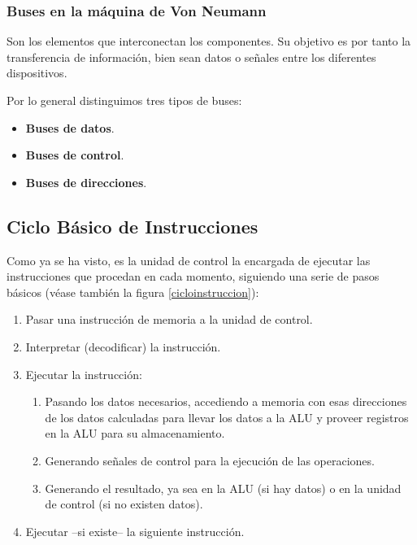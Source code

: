 \documentclass[a4paper, 11pt, titlepage]{article}
\begin{document}
        \subsubsection{Buses en la máquina de Von Neumann}

            Son los elementos que interconectan los componentes. Su objetivo es por tanto la transferencia 
            de información, bien sean datos o señales entre los diferentes dispositivos.

            Por lo general distinguimos tres tipos de buses:

            \begin{itemize}
                \item \textbf{Buses de datos}.
                \item \textbf{Buses de control}.
                \item \textbf{Buses de direcciones}.
            \end{itemize}

    \subsection{Ciclo Básico de Instrucciones}

        Como ya se ha visto, es la unidad de control la encargada de ejecutar las instrucciones que procedan 
        en cada momento, siguiendo una serie de pasos básicos (véase también la figura \ref{cicloinstruccion}):

        \begin{enumerate}
            \item Pasar una instrucción de memoria a la unidad de control.
            \item Interpretar (decodificar) la instrucción.
            \item Ejecutar la instrucción:
            \begin{enumerate}
                \item Pasando los datos necesarios, accediendo a memoria con esas direcciones de los datos 
                calculadas para llevar los datos a la ALU y proveer registros en la ALU para su almacenamiento.
                \item Generando señales de control para la ejecución de las operaciones.
                \item Generando el resultado, ya sea en la ALU (si hay datos) o en la unidad de control (si no 
                existen datos).
            \end{enumerate}
            \item Ejecutar --si existe-- la siguiente instrucción.
        \end{enumerate}
\end{document}
